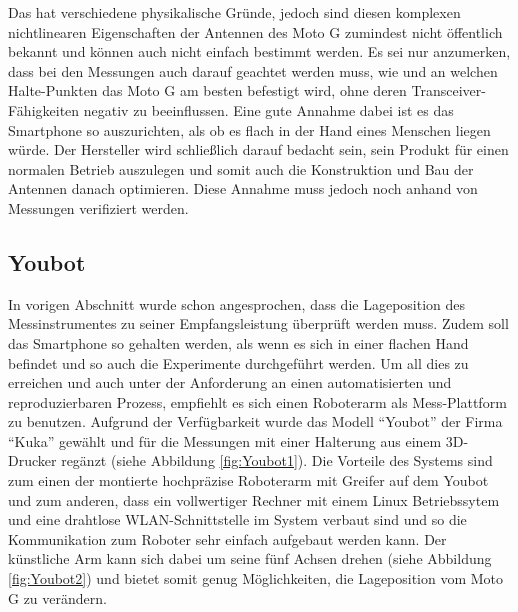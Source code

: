 Das hat verschiedene physikalische Gründe, jedoch sind diesen komplexen nichtlinearen Eigenschaften der Antennen des Moto G zumindest nicht öffentlich bekannt und können auch nicht einfach bestimmt werden. Es sei nur anzumerken, dass bei den Messungen auch darauf geachtet werden muss, wie und an welchen Halte-Punkten das Moto G am besten befestigt wird, ohne deren Transceiver-Fähigkeiten negativ zu beeinflussen. Eine gute Annahme dabei ist es das Smartphone so auszurichten, als ob es flach in der Hand eines Menschen liegen würde. Der Hersteller wird schließlich darauf bedacht sein, sein Produkt für einen normalen Betrieb auszulegen und somit auch die Konstruktion und Bau der Antennen danach optimieren. Diese Annahme muss jedoch noch anhand von Messungen verifiziert werden.
\subsection{Youbot}\label{sec:You}
In vorigen Abschnitt wurde schon angesprochen, dass die Lageposition des Messinstrumentes zu seiner Empfangsleistung überprüft werden muss. Zudem soll das Smartphone so gehalten werden, als wenn es sich in einer flachen Hand befindet und so auch die Experimente durchgeführt werden. Um all dies zu erreichen und auch unter der Anforderung an einen automatisierten und reproduzierbaren Prozess, empfiehlt es sich einen Roboterarm als Mess-Plattform zu benutzen. Aufgrund der Verfügbarkeit wurde das Modell "`Youbot"' der Firma "`Kuka"' gewählt und für die Messungen mit einer Halterung aus einem 3D-Drucker regänzt (siehe Abbildung \ref{fig:Youbot1}). Die Vorteile des Systems sind zum einen der montierte hochpräzise Roboterarm mit Greifer auf dem Youbot und zum anderen, dass ein vollwertiger Rechner mit einem Linux Betriebssytem und eine drahtlose WLAN-Schnittstelle im System verbaut sind und so die Kommunikation zum Roboter sehr einfach aufgebaut werden kann. Der künstliche Arm kann sich dabei um seine fünf Achsen drehen (siehe Abbildung \ref{fig:Youbot2}) und bietet somit genug Möglichkeiten, die Lageposition vom Moto G zu verändern. 
